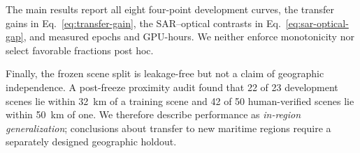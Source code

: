 The main results report all eight four-point development curves, the transfer
gains in Eq.~\ref{eq:transfer-gain}, the SAR--optical contrasts in
Eq.~\ref{eq:sar-optical-gap}, and measured epochs and GPU-hours. We neither
enforce monotonicity nor select favorable fractions post hoc.

Finally, the frozen scene split is leakage-free but not a claim of geographic
independence. A post-freeze proximity audit found that 22 of 23 development
scenes lie within 32~km of a training scene and 42 of 50 human-verified scenes
lie within 50~km of one. We therefore describe performance as \emph{in-region
generalization}; conclusions about transfer to new maritime regions require a
separately designed geographic holdout.
